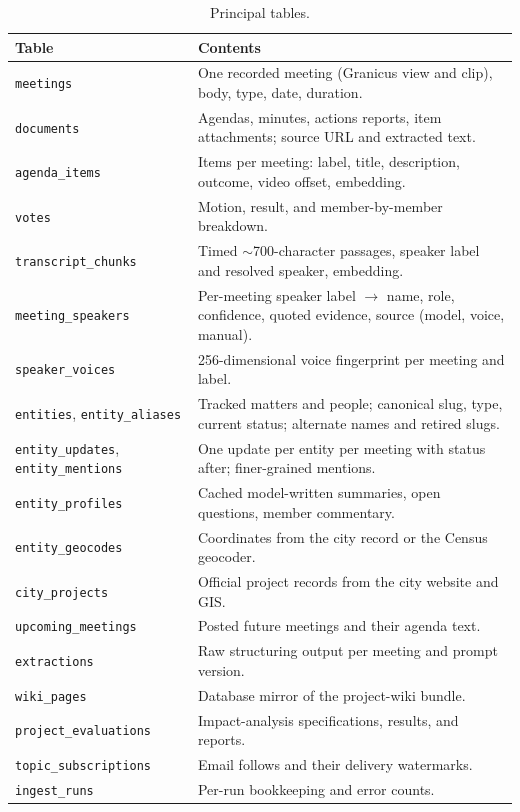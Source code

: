 \documentclass[11pt]{article}
\newcommand{\code}[1]{\texttt{#1}}
\begin{document}
\begin{table}[h]
\centering\small
\begin{tabularx}{\linewidth}{@{}lL@{}}
\toprule
Table & Contents \\
\midrule
\code{meetings} & One recorded meeting (Granicus view and clip), body, type, date, duration. \\
\code{documents} & Agendas, minutes, actions reports, item attachments; source URL and extracted text. \\
\code{agenda\_items} & Items per meeting: label, title, description, outcome, video offset, embedding. \\
\code{votes} & Motion, result, and member-by-member breakdown. \\
\code{transcript\_chunks} & Timed $\sim$700-character passages, speaker label and resolved speaker, embedding. \\
\code{meeting\_speakers} & Per-meeting speaker label $\to$ name, role, confidence, quoted evidence, source (model, voice, manual). \\
\code{speaker\_voices} & 256-dimensional voice fingerprint per meeting and label. \\
\code{entities}, \code{entity\_aliases} & Tracked matters and people; canonical slug, type, current status; alternate names and retired slugs. \\
\code{entity\_updates}, \code{entity\_mentions} & One update per entity per meeting with status after; finer-grained mentions. \\
\code{entity\_profiles} & Cached model-written summaries, open questions, member commentary. \\
\code{entity\_geocodes} & Coordinates from the city record or the Census geocoder. \\
\code{city\_projects} & Official project records from the city website and GIS. \\
\code{upcoming\_meetings} & Posted future meetings and their agenda text. \\
\code{extractions} & Raw structuring output per meeting and prompt version. \\
\code{wiki\_pages} & Database mirror of the project-wiki bundle. \\
\code{project\_evaluations} & Impact-analysis specifications, results, and reports. \\
\code{topic\_subscriptions} & Email follows and their delivery watermarks. \\
\code{ingest\_runs} & Per-run bookkeeping and error counts. \\
\bottomrule
\end{tabularx}
\caption{Principal tables.}
\end{table}
\end{document}
